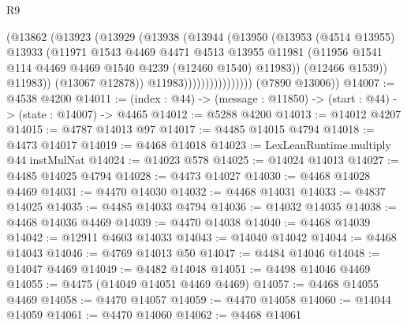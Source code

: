 \begin{lexlean}{R9}
\begin{coremodule}
                                (@13862
                                  (@13923
                                    (@13929
                                      (@13938
                                        (@13944
                                          (@13950
                                            (@13953
                                              (@4514 @13955)
                                              @13933
                                              (@11971
                                                @1543
                                                @4469
                                                @4471
                                                @4513
                                                @13955
                                                @11981
                                                (@11956
                                                  @1541
                                                  @114
                                                  @4469
                                                  @4469
                                                  @1540
                                                  @4239
                                                  (@12460 @1540)
                                                  @11983))
                                              (@12466 @1539))
                                            @11983))
                                        (@13067 @12878))
                                      @11983))))))))))))))))
      (@7890 @13006))
@14007 := @4538 @4200
@14011 := (index : @44) -> (message : @11850) -> (start : @44) -> (state : @14007) -> @4465
@14012 := @5288 @4200
@14013 := @14012 @4207
@14015 := @4787 @14013 @97
@14017 := @4485 @14015 @4794
@14018 := @4473 @14017
@14019 := @4468 @14018
@14023 := LexLeanRuntime.multiply @44 instMulNat
@14024 := @14023 @578
@14025 := @14024 @14013
@14027 := @4485 @14025 @4794
@14028 := @4473 @14027
@14030 := @4468 @14028 @4469
@14031 := @4470 @14030
@14032 := @4468 @14031
@14033 := @4837 @14025
@14035 := @4485 @14033 @4794
@14036 := @14032 @14035
@14038 := @4468 @14036 @4469
@14039 := @4470 @14038
@14040 := @4468 @14039
@14042 := @12911 @4603 @14033
@14043 := @14040 @14042
@14044 := @4468 @14043
@14046 := @4769 @14013 @50
@14047 := @4484 @14046
@14048 := @14047 @4469
@14049 := @4482 @14048
@14051 := @4498 @14046 @4469
@14055 := @4475 (@14049 @14051 @4469 @4469)
@14057 := @4468 @14055 @4469
@14058 := @4470 @14057
@14059 := @4470 @14058
@14060 := @14044 @14059
@14061 := @4470 @14060
@14062 := @4468 @14061

\end{coremodule}
\end{lexlean}
